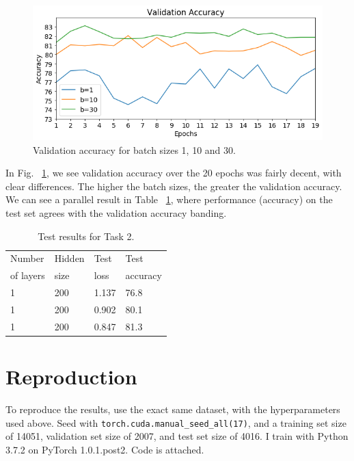 \documentclass[twocolumn, 9pt]{article}
\begin{document}
\begin{figure}[htbp]
	\centering
	\includegraphics[width=\columnwidth]{valacc.png}
	\caption{Validation accuracy for batch sizes 1, 10 and 30.}
	\label{fig:acc}
\end{figure}

In Fig. ~\ref{fig:acc}, we see validation accuracy over the 20 epochs was fairly decent, with
clear differences. The higher the batch sizes, the greater the validation accuracy. We can
see a parallel result in Table ~\ref{tab:res2}, where performance (accuracy) on the test
set agrees with the validation accuracy banding.

\begin{table}[h]
  \centering
  \begin{tabular}{llll}
    \toprule
    Number & Hidden & Test & Test \\
    of layers & size & loss & accuracy \\
    \midrule
    1 & 200  & 1.137 & 76.8 \\
    1 & 200  & 0.902 & 80.1 \\
    1 & 200  & 0.847 & 81.3 \\
    \bottomrule
  \end{tabular}
  \caption{Test results for Task 2.}
  \label{tab:res2}
\end{table}

\section{Reproduction}
To reproduce the results, use the exact same dataset, with the hyperparameters used above.
Seed with \lstinline{torch.cuda.manual_seed_all(17)}, and a training set size of 14051,
validation set size of 2007, and test set size of 4016. I train with Python 3.7.2 on PyTorch
1.0.1.post2. Code is attached.
\end{document}
